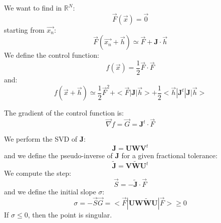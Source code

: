 \documentclass[aps,12pt]{revtex4}
\begin{document}
We want to find in $\mathbb{R}^N$:
\begin{equation}
	\vec{F}(\vec{x}) = \vec{0}
\end{equation}
starting from $\vec{x_n}$:
\begin{equation}
	\vec{F}(\vec{x_n}+\vec{h}) \simeq \vec{F} + \bm{J} \cdot \vec{h}
\end{equation}
We define the control function:
\begin{equation}
	f(\vec{x}) = \dfrac{1}{2} \vec{F} \cdot \vec{F}
\end{equation}
and:
\begin{equation}
	f(\vec{x}+\vec{h}) \simeq \dfrac{1}{2}\vec{F}^2 + <\vec{F} | \bm{J} | \vec{h} > + \dfrac{1}{2} <\vec{h}|\bm{J}^t | \bm{J} | \vec{h}>
\end{equation}

The gradient of the control function is:
\begin{equation}
	\vec{\nabla} f = \vec{G} = \bm{J}^t \cdot \vec{F}
\end{equation}

We perform the SVD of $\bm{J}$:
\begin{equation}
	\bm{J} = \bm{U} \bm{W} \bm{V}^t
\end{equation}
and we define the pseudo-inverse of $\bm{J}$ for a given fractional tolerance:
\begin{equation}
	\tilde{\bm{J}} = \bm{V} \tilde{\bm{W}} \bm{U}^t
\end{equation}	
We compute the step:
\begin{equation}
	\vec{S} = - \tilde{\bm{J}} \cdot \vec{F} 
\end{equation}
and we define the initial slope $\sigma$:
\begin{equation}
	\sigma = -\vec{S}\vec{G} = <\vec{F}| \bm{U} \bm{W}\tilde{\bm{W}}\bm{U}|\vec{F}> \geq 0
\end{equation}
If $\sigma\leq 0$, then the point is singular.
\end{document}
